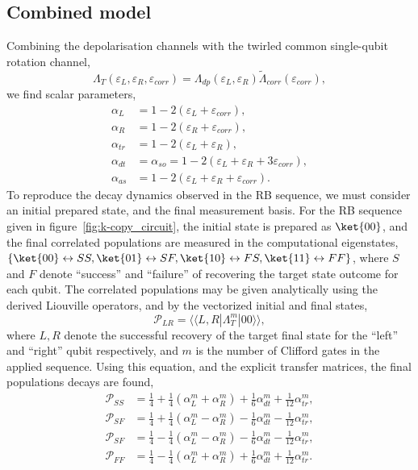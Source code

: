 \subsection{Combined model}
\label{app:combined_model}
Combining the depolarisation channels with the twirled common single-qubit rotation channel, 
\begin{equation}
    \Lambda_{T}(\varepsilon_L, \varepsilon_R,\varepsilon_{corr})=\Lambda_{dp}(\varepsilon_L,\varepsilon_R)\tilde\Lambda_{corr}(\varepsilon_{corr}),
\end{equation}
we find scalar parameters,
\begin{align}\label{eqn:app_bases}
    \alpha_L &= 1-2\left(\varepsilon_L+\varepsilon_{corr}\right),\\
    \alpha_R &= 1-2\left(\varepsilon_R+\varepsilon_{corr}\right),\\
    \alpha_{tr} &= 1 - 2\left(\varepsilon_L+ \varepsilon_R\right),\\
    \alpha_{dt} &=\alpha_{so}= 1 - 2\left(\varepsilon_L+ \varepsilon_R +3\varepsilon_{corr}\right),\\
    \alpha_{as} &=  1 - 2\left(\varepsilon_L+\varepsilon_R +\varepsilon_{corr}\right).
\end{align}
To reproduce the decay dynamics observed in the RB sequence, we must consider an initial prepared state, and the final measurement basis.
For the RB sequence given in figure~\ref{fig:k-copy_circuit}, the initial state is prepared as $\ket{00}$, and the final correlated populations are measured in the computational eigenstates, $\{\ket{00}\leftrightarrow SS, \ket{01}\leftrightarrow SF, \ket{10}\leftrightarrow FS, \ket{11}\leftrightarrow FF\}$, where $S$ and $F$ denote ``success'' and ``failure'' of recovering the target state outcome for each qubit.
The correlated populations may be given analytically using the derived Liouville operators, and by the vectorized initial and final states,
\begin{equation}\label{eqn:rb_meas}
    \mathcal{P}_{LR}=\langle\langle L,R|\Lambda_T^m|00\rangle\rangle,
\end{equation}
where $L,R$ denote the successful recovery of the target final state for the ``left'' and ``right'' qubit respectively, and $m$ is the number of Clifford gates in the applied sequence.
Using this equation, and the explicit transfer matrices, the final populations decays are found,
\begin{align}\label{eqn:app_pops}
    \mathcal{P}_{SS} &=  \frac{1}{4}+\frac{1}{4}(\alpha_L^m+\alpha_R^m) + \frac{1}{6}\alpha_{dt}^m+\frac{1}{12}\alpha_{tr}^m,   \\
    \mathcal{P}_{SF} &=  \frac{1}{4} + \frac{1}{4}(\alpha_L^m-\alpha_R^m) - \frac{1}{6}\alpha_{dt}^m-\frac{1}{12}\alpha_{tr}^m,   \\
    \mathcal{P}_{SF} &=  \frac{1}{4} - \frac{1}{4}(\alpha_L^m-\alpha_R^m) - \frac{1}{6}\alpha_{dt}^m-\frac{1}{12}\alpha_{tr}^m,   \\
    \mathcal{P}_{FF} &=  \frac{1}{4}-\frac{1}{4}(\alpha_L^m+\alpha_R^m) + \frac{1}{6}\alpha_{dt}^m+\frac{1}{12}\alpha_{tr}^m.   
\end{align}

